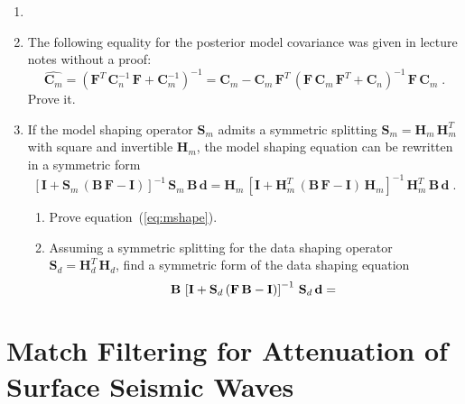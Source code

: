 \begin{enumerate}

\item \item The following equality for the posterior model covariance was given in lecture notes without a proof:
\begin{equation}
  \label{eq:cpost}
\widehat{\mathbf{C}_m} = \left(\mathbf{F}^T\,\mathbf{C}_n^{-1}\,\mathbf{F} + \mathbf{C}_{m}^{-1}\right)^{-1}=
\mathbf{C}_m-\mathbf{C}_m\,\mathbf{F}^T\,\left(\mathbf{F}\,\mathbf{C}_{m}\,\mathbf{F}^T + \mathbf{C}_n\right)^{-1}\,\mathbf{F}\,\mathbf{C}_m\;.
\end{equation}
Prove it.

\item If the model shaping operator $\mathbf{S}_m$ admits a
symmetric splitting $\mathbf{S}_m=\mathbf{H}_m\,\mathbf{H}_m^T$ with square and invertible
$\mathbf{H}_m$, the model shaping equation can be rewritten in a symmetric form
\begin{equation}
\label{eq:mshape}
\left[\mathbf{I} + \mathbf{S}_m\,(\mathbf{B\,F - I})\right]^{-1}\,\mathbf{S}_m\,\mathbf{B\,d} 
= \mathbf{H}_m\,\left[\mathbf{I} + \mathbf{H}_m^T\,(\mathbf{B\,F - I})\,\mathbf{H}_m\right]^{-1}\,\mathbf{H}_m^T\,\mathbf{B\,d}\;.
\end{equation}
\begin{enumerate}
\item Prove equation~(\ref{eq:mshape}).
\item Assuming a symmetric splitting for the data shaping operator $\mathbf{S}_d=\mathbf{H}_d^T\,\mathbf{H}_d$, find a symmetric form of the data shaping equation
\begin{equation}
\label{eq:dshape}
\mathbf{B}\,\left[\mathbf{I} + \mathbf{S}_d\,(\mathbf{F\,B - I})\right]^{-1}\, \mathbf{S}_d\,\mathbf{d} = \hfill \ 
\end{equation}
\end{enumerate}

\end{enumerate}


\section{Match Filtering for Attenuation of Surface Seismic Waves}
\inputdir{match}


